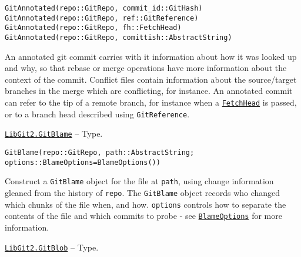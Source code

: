 \begin{adjustwidth}{2em}{0pt}


\begin{verbatim}
GitAnnotated(repo::GitRepo, commit_id::GitHash)
GitAnnotated(repo::GitRepo, ref::GitReference)
GitAnnotated(repo::GitRepo, fh::FetchHead)
GitAnnotated(repo::GitRepo, comittish::AbstractString)
\end{verbatim}

An annotated git commit carries with it information about how it was looked up and why, so that rebase or merge operations have more information about the context of the commit. Conflict files contain information about the source/target branches in the merge which are conflicting, for instance. An annotated commit can refer to the tip of a remote branch, for instance when a \hyperlink{17806809481919147110}{\texttt{FetchHead}} is passed, or to a branch head described using \texttt{GitReference}.



\end{adjustwidth}
\hypertarget{11166114255561117709}{} 
\hyperlink{11166114255561117709}{\texttt{LibGit2.GitBlame}}  -- {Type.}

\begin{adjustwidth}{2em}{0pt}


\begin{verbatim}
GitBlame(repo::GitRepo, path::AbstractString; options::BlameOptions=BlameOptions())
\end{verbatim}

Construct a \texttt{GitBlame} object for the file at \texttt{path}, using change information gleaned from the history of \texttt{repo}. The \texttt{GitBlame} object records who changed which chunks of the file when, and how. \texttt{options} controls how to separate the contents of the file and which commits to probe - see \hyperlink{13109557230915215869}{\texttt{BlameOptions}} for more information.



\end{adjustwidth}
\hypertarget{13272891135715880949}{} 
\hyperlink{13272891135715880949}{\texttt{LibGit2.GitBlob}}  -- {Type.}


